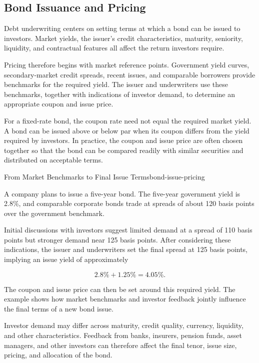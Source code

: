 \subsection{Bond Issuance and Pricing}

Debt underwriting centers on setting terms at which a bond can be issued to investors. Market yields, the issuer's credit characteristics, maturity, seniority, liquidity, and contractual features all affect the return investors require.

Pricing therefore begins with market reference points. Government yield curves, secondary-market credit spreads, recent issues, and comparable borrowers provide benchmarks for the required yield. The issuer and underwriters use these benchmarks, together with indications of investor demand, to determine an appropriate coupon and issue price.

For a fixed-rate bond, the coupon rate need not equal the required market yield. A bond can be issued above or below par when its coupon differs from the yield required by investors. In practice, the coupon and issue price are often chosen together so that the bond can be compared readily with similar securities and distributed on acceptable terms.

\begin{example}{From Market Benchmarks to Final Issue Terms}{bond-issue-pricing}

A company plans to issue a five-year bond. The five-year government yield is 2.8\%, and comparable corporate bonds trade at spreads of about 120 basis points over the government benchmark.

Initial discussions with investors suggest limited demand at a spread of 110 basis points but stronger demand near 125 basis points. After considering these indications, the issuer and underwriters set the final spread at 125 basis points, implying an issue yield of approximately

\[
2.8\%+1.25\%=4.05\%.
\]

The coupon and issue price can then be set around this required yield. The example shows how market benchmarks and investor feedback jointly influence the final terms of a new bond issue.

\end{example}

Investor demand may differ across maturity, credit quality, currency, liquidity, and other characteristics. Feedback from banks, insurers, pension funds, asset managers, and other investors can therefore affect the final tenor, issue size, pricing, and allocation of the bond.

